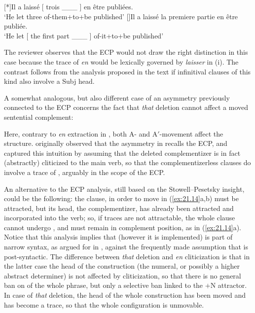 \documentclass[output=paper]{langsci/langscibook}
\begin{document}
\begin{exe}
{\begin{exe}
    [*]{Il a laissé [ trois \_\_\_ ]  en être publiées.\\
        ‘He let three of-them+to+be published’}
    []{Il a laissé la premiere partie en être publiée.\\
        ‘He let [ the first part \_\_\_ ] of-it+to+be published’}
\end{exe}
%
The reviewer observes that the \gls{ECP} would not draw the right distinction
in this case because the trace of \emph{en} would be lexically governed by
\emph{laisser} in (i). The contrast follows from the analysis proposed in the
text if infinitival clauses of this kind also involve a  Subj\tss{[$+$N]} head.}

A somewhat analogous, but also different case of an asymmetry previously
connected to the \gls{ECP} concerns the fact that \emph{that} deletion cannot
affect a moved sentential complement:

\ea%
    \label{ex:21.14}
    \z
\z
%
Here, contrary to \emph{en} extraction in , both A- and A$'$-movement
affect the structure. \citet{Stowell1981} originally observed that the
asymmetry in  recalls the \gls{ECP}, and \citet{Pesetsky1995}
captured this intuition by assuming that the deleted complementizer is in fact
(abstractly) cliticized to the main verb, so that the complementizerless
clauses do involve a trace of , arguably in the scope of the ECP.

An alternative to the \gls{ECP} analysis, still
based on the Stowell--Pesetsky insight, could be the following: the clause, in
order to move in (\ref{ex:21.14}a,b) must be attracted, but its head, the
complementizer, has already been attracted and incorporated
into the verb; so, if traces are not attractable, the whole clause cannot
undergo , and must remain in complement position, as in
(\ref{ex:21.14}a). Notice that this analysis implies that 
(however it is implemented) is part of narrow syntax, as argued for in
\citet{Roberts2010}, against the frequently made assumption that  is post-syntactic. The difference between \emph{that} deletion and
\emph{en} cliticization is that in the latter case the head of the construction
(the numeral, or possibly a higher abstract determiner) is not affected by
cliticization, so that there is no general ban on  of the whole
phrase, but only a selective ban linked to the $+$N attractor. In case of
\emph{that} deletion, the head of the whole construction has been moved and has
become a trace, so that the whole configuration is unmovable.


\end{exe}
\end{document}
